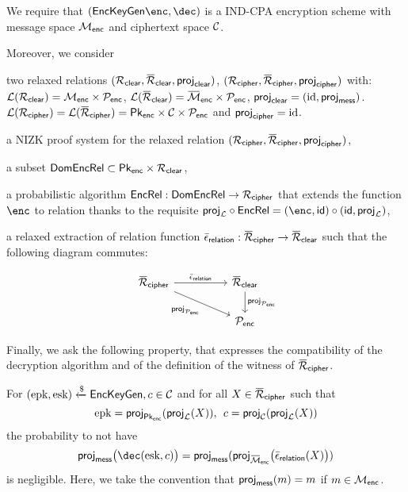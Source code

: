 	We require that $(\EncKeyGen \Enc, \Dec)$ is a IND-CPA 
encryption scheme with message space $\mathcal{M}_{\mathsf{enc}}$ and ciphertext space 
$\mathcal{C}$.

Moreover, we consider 
	\begin{compactitem}
		\item two relaxed relations $(\relationclear, \barrelationclear,
\projclear)$, $(\relationcipher, \barrelationcipher,\allowbreak \projcipher)$ 
			with:
		$\mathcal{L}(\mathcal{R}_{\mathsf{clear}}) = \mathcal{M}_{\mathsf{enc}} \times \mathcal{P}_{\mathsf{enc}}$,
		$\Language{\barrelationclear} = \SetRelMessEnc \times \SetPubEnc$, $\projclear =
	(\idfunction, \projenc)$. 
		$\Language{\relationcipher} = \Language{\barrelationcipher} = \SetPublicKeysEnc \times \SetCipherEnc \times
	\SetPubEnc$ and $\projcipher = \idfunction$.

	\item a NIZK proof system for the relaxed relation 
$(\relationcipher, \barrelationcipher,\allowbreak \projcipher)$,


 \item a subset $\mathsf{DomEncRel} \subset \mathsf{Pk}_{\mathsf{enc}} \times \mathcal{R}_{\mathsf{clear}}$,

\item a probabilistic algorithm $\mathsf{EncRel} : \mathsf{DomEncRel} \rightarrow 
\mathcal{R}_{\mathsf{cipher}}$ that extends the function $\Enc$ to relation thanks to 
the requisite $\projL \circ \EncRel = (\Enc, \id) \circ (\id, \projL)$,

\item a relaxed extraction of relation function $\barextractionrelation 
:\barrelationcipher \rightarrow \barrelationclear$ such that the 
following diagram commutes:

\[ \begin{tikzcd}
	\barrelationcipher \arrow{rr}{\barextractionrelation}
	\arrow[swap]{drr}{\proj_{\SetPubEnc}}
	 &&\barrelationclear \arrow{d}{\proj_{\SetPubEnc}} \\
	&& \SetPubEnc\end{tikzcd} \]
\end{compactitem}
	Finally, we ask the following property, that expresses
	the compatibility of the decryption algorithm and of the definition of the witness of
	$\barrelationcipher$.
	\begin{compactitem}
	\item For $(\text{epk}, \text{esk}) \xleftarrow{\$} \mathsf{EncKeyGen}, c \in \mathcal{C}$ and for all $X \in \barrelationcipher$ such
		that \[\epk = \proj[\SetPublicKeysEnc](\projL(X)),\:\: \cipher = \proj_{\SetCipherEnc}(\projL(X))\]
	the probability to not have
	\[ \projenc\big(\Dec(\esk, \cipher)\big) = \projenc(\proj_{\SetRelMessEnc}\big(\barextractionrelation(X)\big))\]
	is negligible. Here, we take the convention that $\projenc(m) = m$ if $m \in \mathcal{M}_{\mathsf{enc}}$.
\end{compactitem}


